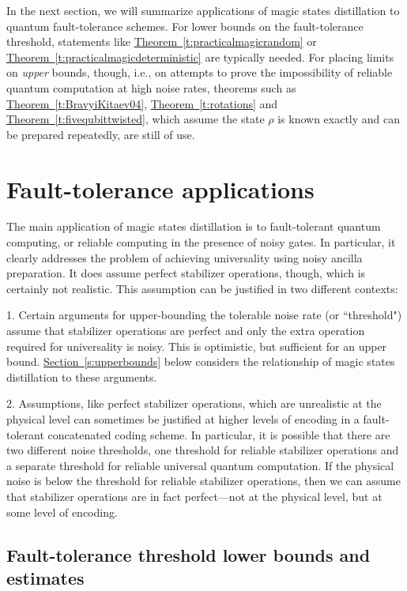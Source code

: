 \documentclass[11pt]{article}
\theoremstyle{note}
\newcommand{\thmref}[1]{\hyperref[#1]{{Theorem~\ref*{#1}}}}
\newcommand{\secref}[1]{\hyperref[#1]{{Section~\ref*{#1}}}}
\begin{document}
In the next section, we will summarize applications of magic states distillation to quantum fault-tolerance schemes.  For lower bounds on the fault-tolerance threshold, statements like \thmref{t:practicalmagicrandom} or \thmref{t:practicalmagicdeterministic} are typically needed.  For placing limits on \emph{upper} bounds, though, i.e., on attempts to prove the impossibility of reliable quantum computation at high noise rates, theorems such as \thmref{t:BravyiKitaev04}, \thmref{t:rotations} and \thmref{t:fivequbittwisted}, which assume the state $\rho$ is known exactly and can be prepared repeatedly, are still of use.  


\section{Fault-tolerance applications} \label{s:faulttolerance}

The main application of magic states distillation is to fault-tolerant quantum computing, or reliable computing in the presence of noisy gates.  In particular, it clearly addresses the problem of achieving universality using noisy ancilla preparation.  It does assume perfect stabilizer operations, though, which is certainly not realistic.  This assumption can be justified in two different contexts: 

1. Certain arguments for upper-bounding the tolerable noise rate (or ``threshold") assume that stabilizer operations are perfect and only the extra operation required for universality is noisy.  This is optimistic, but sufficient for an upper bound.  \secref{s:upperbounds} below considers the relationship of magic states distillation to these arguments.  

2. Assumptions, like perfect stabilizer operations, which are unrealistic at the physical level can sometimes be justified at higher levels of encoding in a fault-tolerant concatenated coding scheme.  In particular, it is possible that there are two different noise thresholds, one threshold for reliable stabilizer operations and a separate threshold for reliable universal quantum computation.  If the physical noise is below the threshold for reliable stabilizer operations, then we can assume that stabilizer operations are in fact perfect---not at the physical level, but at some level of encoding.  


\subsection{Fault-tolerance threshold lower bounds and estimates} \label{s:lowerbounds}
\end{document}
